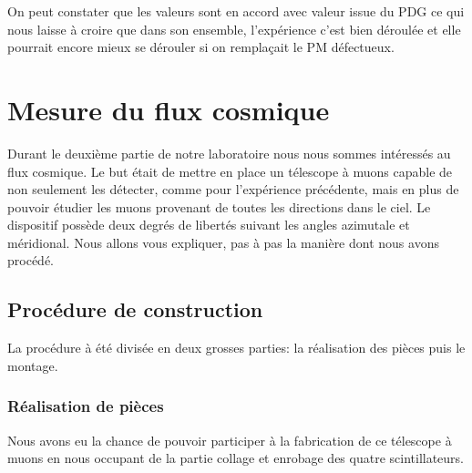 \documentclass[12pt]{article}
\begin{document}
On peut constater que les valeurs sont en accord avec valeur issue du PDG ce qui nous laisse à croire que dans son ensemble, l'expérience c'est bien déroulée et elle pourrait encore mieux se dérouler si on remplaçait le PM défectueux.


\newpage



\section{Mesure du flux cosmique}

Durant le deuxième partie de notre laboratoire nous nous sommes intéressés au flux cosmique. Le but était de mettre en place un télescope à muons capable de non seulement les détecter, comme pour l'expérience précédente, mais en plus de pouvoir étudier les muons provenant de toutes les directions dans le ciel. Le dispositif possède deux degrés de libertés suivant les angles azimutale et méridional. Nous allons vous expliquer, pas à pas la manière dont nous avons procédé. 

\subsection{Procédure de construction}

La procédure à été divisée en deux grosses parties: la réalisation des pièces puis le montage. 

\subsubsection{Réalisation de pièces}

Nous avons eu la chance de pouvoir participer à la fabrication de ce télescope à muons en nous occupant de la partie collage et enrobage des quatre scintillateurs. 
\end{document}
